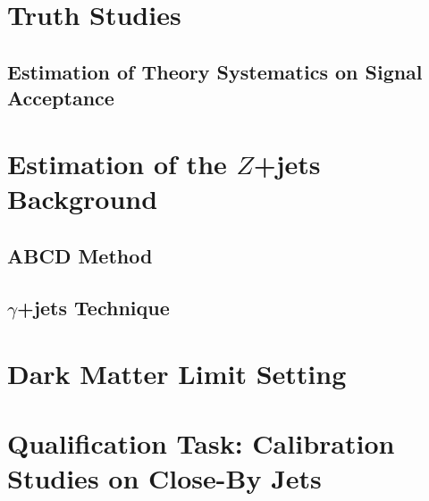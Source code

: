 \label{chapter:prevWork}

\section{Truth Studies} 

\subsection{Estimation of Theory Systematics on Signal Acceptance}

\section{Estimation of the $Z$+jets Background}

\subsection{ABCD Method}

\subsection{$\gamma$+jets Technique}

\section{Dark Matter Limit Setting}

\section{Qualification Task: Calibration Studies on Close-By Jets}